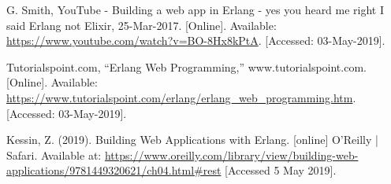 \documentclass[11 pt]{IEEEtran}
\begin{document}
\begin{thebibliography}{99}
G. Smith, YouTube - Building a web app in Erlang - yes you heard me right I said Erlang not Elixir, 25-Mar-2017. [Online]. Available: \url{https://www.youtube.com/watch?v=BO-8Hx8kPtA}. [Accessed: 03-May-2019].

Tutorialspoint.com, ``Erlang Web Programming,'' www.tutorialspoint.com. [Online]. Available: \url{https://www.tutorialspoint.com/erlang/erlang_web_programming.htm}. [Accessed: 03-May-2019].

Kessin, Z. (2019). Building Web Applications with Erlang. [online] O'Reilly | Safari. Available at: \url{https://www.oreilly.com/library/view/building-web-applications/9781449320621/ch04.html#rest} [Accessed 5 May 2019].

\end{thebibliography}
\end{document}
